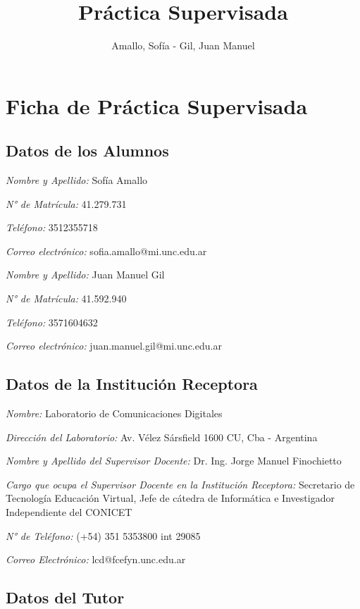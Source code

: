 \documentclass[12pt]{article}
\title{\huge Práctica Supervisada\vspace*{5cm}}
\author{Amallo, Sofía - Gil, Juan Manuel}
\date{\parbox{\linewidth}{\centering%
  Noviembre 18, 2022 \endgraf\bigskip
  \vspace*{4cm}
  Dr. Ing. Horacio A. Mendoza \hspace*{1cm} Dr. Ing. Jorge Finochietto\endgraf\medskip
  \vspace*{0.5cm}
  Laboratorio de\ Comunicaciones Digitales \endgraf
  Universidad Nacional de Córdoba}}
\begin{document}
\maketitle
\thispagestyle{empty}
\newpage

\pagestyle{myheadings}
\markright{}

\section{Ficha de Práctica Supervisada}
\subsection{Datos de los Alumnos}
\raggedright
\textsl{Nombre y Apellido:}  Sofía Amallo

\textsl{N° de Matrícula:} 41.279.731

\textsl{Teléfono:} 3512355718

\textsl{Correo electrónico:} sofia.amallo@mi.unc.edu.ar
\vspace*{0.5cm}

\textsl{Nombre y Apellido:} Juan Manuel Gil

\textsl{N° de Matrícula:} 41.592.940

\textsl{Teléfono:} 3571604632

\textsl{Correo electrónico:} juan.manuel.gil@mi.unc.edu.ar

\subsection{Datos de la Institución Receptora}
\textsl{Nombre:} Laboratorio de Comunicaciones Digitales

\textsl{Dirección del Laboratorio:} Av. Vélez Sársfield 1600 CU, Cba - Argentina

\textsl{Nombre y Apellido del Supervisor Docente:} Dr. Ing. Jorge Manuel Finochietto

\textsl{Cargo que ocupa el Supervisor Docente en la Institución Receptora:} Secretario de Tecnología  Educación Virtual, Jefe de cátedra de Informática e Investigador Independiente del CONICET

\textsl{N° de Teléfono:} (+54) 351 5353800 int 29085

\textsl{Correo Electrónico:} lcd@fcefyn.unc.edu.ar

\subsection{Datos del Tutor}
\end{document}
